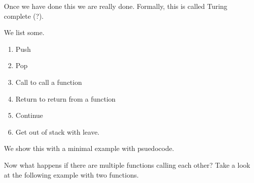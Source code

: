   Once we have done this we are really done. Formally, this is called Turing complete (?). 

  \begin{definition}
    We list some. 
    \begin{enumerate}
      \item Push 
      \item Pop 
      \item Call to call a function 
      \item Return to return from a function 
      \item Continue 
      \item Get out of stack with leave.  
    \end{enumerate}
  \end{definition}

  \begin{example}
    We show this with a minimal example with psuedocode. 
  \end{example}


  \begin{example}
    Now what happens if there are multiple functions calling each other? Take a look at the following example with two functions. 
    
  \end{example}

